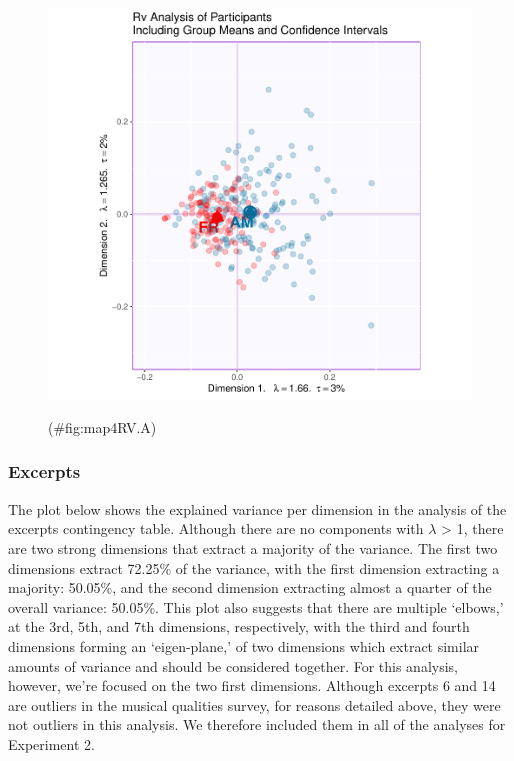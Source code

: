 \documentclass[
  english,
  man,floatsintext]{apa6}
\begin{document}
\begin{figure}

{\centering \includegraphics{Music-Descriptor-Space_files/figure-latex/map4RV.A-1} 

}

\caption{ }(\#fig:map4RV.A)
\end{figure}

\hypertarget{excerpts-1}{%
\subsubsection{Excerpts}\label{excerpts-1}}

The plot below shows the explained variance per dimension in the analysis of the excerpts contingency table. Although there are no components with \(\lambda\) \textgreater{} 1, there are two strong dimensions that extract a majority of the variance. The first two dimensions extract 72.25\% of the variance, with the first dimension extracting a majority: 50.05\%, and the second dimension extracting almost a quarter of the overall variance: 50.05\%. This plot also suggests that there are multiple `elbows,' at the 3rd, 5th, and 7th dimensions, respectively, with the third and fourth dimensions forming an `eigen-plane,' of two dimensions which extract similar amounts of variance and should be considered together. For this analysis, however, we're focused on the two first dimensions.
Although excerpts 6 and 14 are outliers in the musical qualities survey, for reasons detailed above, they were not outliers in this analysis. We therefore included them in all of the analyses for Experiment 2.
\end{document}
